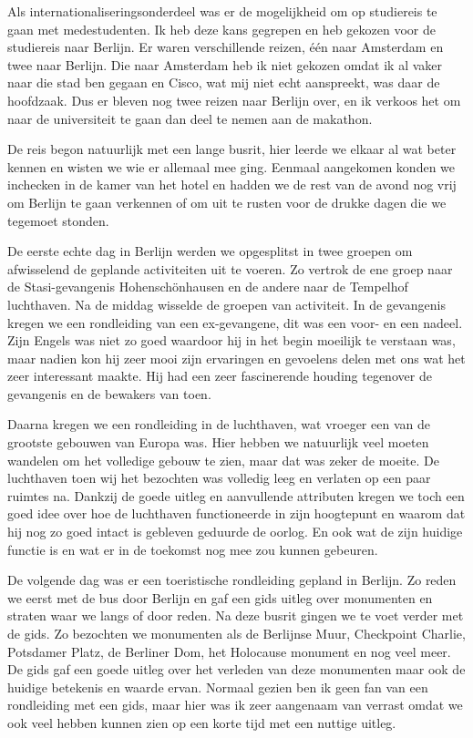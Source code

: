 
Als internationaliseringsonderdeel was er de mogelijkheid om op studiereis te gaan met medestudenten. Ik heb deze kans gegrepen en heb gekozen voor de studiereis naar Berlijn. Er waren verschillende reizen, één naar Amsterdam en twee naar Berlijn. Die naar Amsterdam heb ik niet gekozen omdat ik al vaker naar die stad ben gegaan en Cisco, wat mij niet echt aanspreekt, was daar de hoofdzaak. Dus er bleven nog twee reizen naar Berlijn over, en ik verkoos het om naar de universiteit te gaan dan deel te nemen aan de makathon.

De reis begon natuurlijk met een lange busrit, hier leerde we elkaar al wat beter kennen en wisten we wie er allemaal mee ging. Eenmaal aangekomen konden we inchecken in de kamer van het hotel en hadden we de rest van de avond nog vrij om Berlijn te gaan verkennen of om uit te rusten voor de drukke dagen die we tegemoet stonden.

De eerste echte dag in Berlijn werden we opgesplitst in twee groepen om afwisselend de geplande activiteiten uit te voeren. Zo vertrok de ene groep naar de Stasi\hyp{}gevangenis Hohensch\"onhausen en de andere naar de Tempelhof luchthaven. Na de middag wisselde de groepen van activiteit. In de gevangenis kregen we een rondleiding van een ex\hyp{}gevangene, dit was een voor\hyp{} en een nadeel. Zijn Engels was niet zo goed waardoor hij in het begin moeilijk te verstaan was, maar nadien kon hij zeer mooi zijn ervaringen en gevoelens delen met ons wat het zeer interessant maakte. Hij had een zeer fascinerende houding tegenover de gevangenis en de bewakers van toen.

Daarna kregen we een rondleiding in de luchthaven, wat vroeger een van de grootste gebouwen van Europa was. Hier hebben we natuurlijk veel moeten wandelen om het volledige gebouw te zien, maar dat was zeker de moeite. De luchthaven toen wij het bezochten was volledig leeg en verlaten op een paar ruimtes na. Dankzij de goede uitleg en aanvullende attributen kregen we toch een goed idee over hoe de luchthaven functioneerde in zijn hoogtepunt en waarom dat hij nog zo goed intact is gebleven geduurde de oorlog. En ook wat de zijn huidige functie is en wat er in de toekomst nog mee zou kunnen gebeuren.

De volgende dag was er een toeristische rondleiding gepland in Berlijn. Zo reden we eerst met de bus door Berlijn en gaf een gids uitleg over monumenten en straten waar we langs of door reden. Na deze busrit gingen we te voet verder met de gids. Zo bezochten we monumenten als de Berlijnse Muur, Checkpoint Charlie, Potsdamer Platz, de Berliner Dom, het Holocause monument en nog veel meer. De gids gaf een goede uitleg over het verleden van deze monumenten maar ook de huidige betekenis en waarde ervan. Normaal gezien ben ik geen fan van een rondleiding met een gids, maar hier was ik zeer aangenaam van verrast omdat we ook veel hebben kunnen zien op een korte tijd met een nuttige uitleg.

